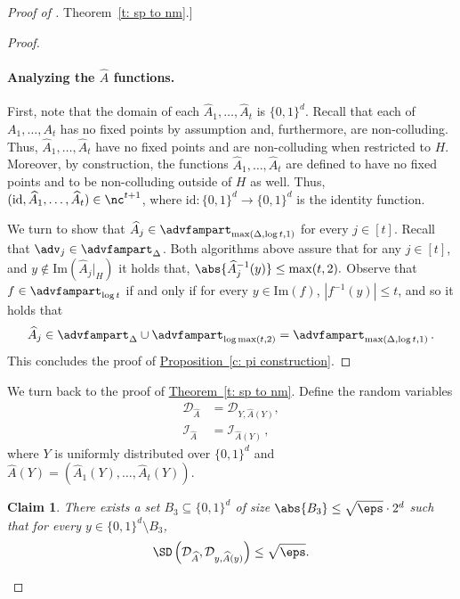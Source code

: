 \documentclass[11pt]{article}
\numberwithin{equation}{section}
\newtheorem{claim}[theorem]{Claim}
\theoremstyle{definition}
\theoremstyle{plain}
\newcommand{\expref}[2]{\hyperref[#2]{#1~\ref{#2}}}
\begin{document}
\begin{proof}[Proof of \expref{Theorem}{t: sp to nm}.]
\begin{proof}
%
\paragraph{Analyzing the $\widehat{A}$ functions.}
First, note that the domain of each $\widehat{A}_1,\ldots,\widehat{A}_t$ is $\{0,1\}^d$. Recall that each of $A_1,\ldots,A_t$ has no fixed points by assumption and, furthermore, are non-colluding. Thus, $\widehat{A}_1,\ldots,\widehat{A}_t$ have no fixed points and are non-colluding when restricted to $H$. Moreover, by construction, the functions $\widehat{A}_1,\ldots,\widehat{A}_t$ are defined to have no fixed points and to be non-colluding outside of $H$ as well. Thus,  $(\mathrm{id},\widehat{A}_1,\ldots,\widehat{A}_t) \in \nc^{t+1}$, where $\mathrm{id} \colon \{0,1\}^d \to \{0,1\}^d$ is the identity function. 

We turn to show that $\widehat{A}_j \in \advfampart_{\max(\Delta, \log t,1)}$ for every $j \in [t]$.  
Recall that $\adv_j \in \advfampart_{\Delta}$. Both algorithms above assure that for any $j\in [t]$, and $y \notin \mathrm{Im}(\widehat{A}_j|_H)$ it holds that, $\abs{\widehat{A}_j^{-1}(y)} \leq \max(t,2).$
Observe that $f \in \advfampart_{\log t}$ if and only if 
for every $y \in \mathrm{Im}(f)$, $|f^{-1}(y)| \le t$,
and so
it holds that
\[
\widehat{A}_j \in \advfampart_{\Delta} \cup \advfampart_{\log \max(t,2)} =\advfampart_{\max(\Delta, \log t,1)}\,.
\]
This concludes the proof of \expref{Proposition}{c: pi construction}.
\end{proof}

We turn back to the proof of \expref{Theorem}{t: sp to nm}.
%
Define the random variables
\begin{align*}
    \mathcal{D}_{\widehat{A}} &= \mathcal{D}_{Y,\widehat{A}(Y)},\\
    \mathcal{I}_{\widehat{A}} &= \mathcal{I}_{\widehat{A}(Y)}\,,
\end{align*}
where $Y$ is uniformly distributed over $\{0,1\}^d$ and $\widehat{A}(Y) =  (\widehat{A}_1(Y),\ldots,\widehat{A}_t(Y))$.

%

\begin{claim}\label{claim:d is concentrated}
	There exists a set $B_3 \subseteq \{0,1\}^d$ of size $\abs{B_3} \le \sqrt{\eps} \cdot 2^d$ such that for every $y \in \{0,1\}^d \setminus B_3$,
	\[
	\SD\left(\mathcal{D}_{\widehat{A}}, \mathcal{D}_{y,\widehat{A}(y)}\right) \le \sqrt{\eps}.
	\]
\end{claim}


\end{proof}
\end{document}
